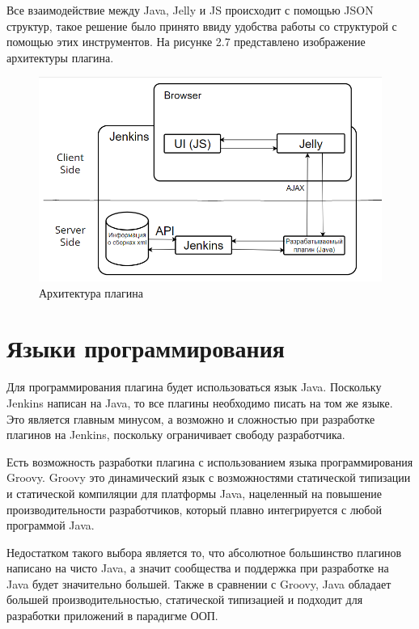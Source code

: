 Все взаимодействие между Java, Jelly и JS происходит с помощью JSON структур, такое решение было принято ввиду удобства работы со структурой с помощью этих инструментов. На рисунке 2.7 представлено изображение архитектуры плагина.

\begin{figure}[ht!] 
	\center
	\includegraphics [scale=0.67] {my_folder/images//archpl3}
	\caption{Архитектура плагина} 
	\label{fig:ArchitecturePlugin}  
\end{figure}


\section{Языки программирования} \label{ch1:sec4}

Для программирования плагина будет использоваться язык Java. Поскольку Jenkins написан на Java, то все плагины необходимо писать на том же языке. Это является главным минусом, а возможно и сложностью при разработке плагинов на Jenkins, поскольку ограничивает свободу разработчика.

Есть возможность разработки плагина с использованием языка программирования Groovy. Groovy это динамический язык с возможностями статической типизации и статической компиляции для платформы Java\cite{groovy}, нацеленный на повышение производительности разработчиков, который плавно интегрируется с любой программой Java.

Недостатком такого выбора является то, что абсолютное большинство плагинов написано на чисто Java, а значит сообщества и поддержка при разработке на Java будет значительно большей. Также в сравнении с Groovy, Java обладает большей производительностью\cite{groovyvsjava}, статической типизацией и подходит для разработки приложений в парадигме ООП.

